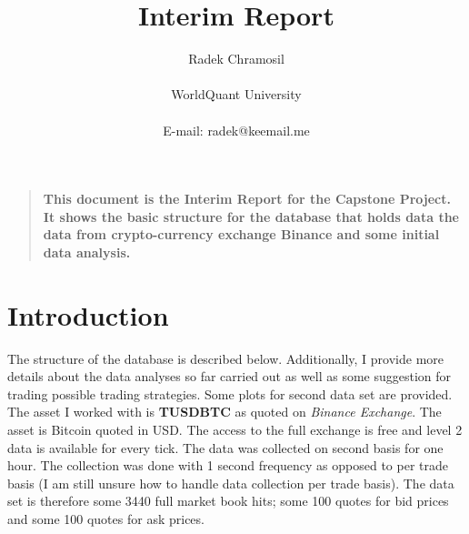 \documentclass[12pt]{article}
\title{Interim Report}
\author
{Radek Chramosil\\
\\
\normalsize{WorldQuant University}\\
\\
\normalsize{E-mail:  radek@keemail.me}
}
\date{}
\newenvironment{sciabstract}{%
\begin{quote} \bf}
{\end{quote}}
\begin{document}
 


\baselineskip24pt


\maketitle 




\begin{sciabstract}
This document is the Interim Report for the Capstone Project. It shows the basic structure for the database that holds data the data from crypto-currency exchange Binance and some initial data analysis.
\end{sciabstract}


\section*{Introduction}
The structure of the database is described below. Additionally,  I provide more details about the data analyses so far carried out as well as some suggestion for trading possible trading strategies. Some plots for second data set are provided. The asset I worked with is \textbf{TUSDBTC} as quoted on \textit{Binance Exchange}. The asset is Bitcoin quoted in USD. The access to the full exchange is free and level 2 data is available for every tick. The data was collected on second basis for one hour. The collection was done with 1 second frequency as opposed to per trade basis (I am still unsure how to handle data collection per trade basis). The data set is therefore some 3440 full market book hits; some 100 quotes for bid prices and some 100 quotes for ask prices.
\end{document}
